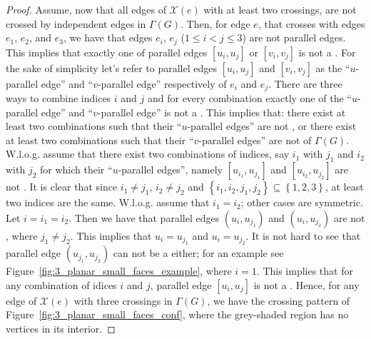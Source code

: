 \begin{proof}
Assume, now that all edges of $\mathcal{X}(e)$ with at least two crossings, are not crossed by independent edges in $\Gamma(G)$. Then, for edge $e$, that crosses with edges $e_1$, $e_2$, and $e_3$, we have that edges $e_i$, $e_j$ ($1\leq i<j\leq 3$) are not parallel edges. This implies that exactly one of parallel edges $[u_i,u_j]$ or $[v_i,v_j]$ is not a \pe. For the sake of simplicity let's refer to parallel edges $[u_i,u_j]$ and $[v_i,v_j]$ as the ``$u$-parallel edge'' and ``$v$-parallel edge'' respectively of $e_i$ and $e_j$. 
There are three ways to combine indices $i$ and $j$ and for every combination exactly one of the ``$u$-parallel edge'' and ``$v$-parallel edge'' is not a \pe. This implies that: there exist at least two combinations such that their ``$u$-parallel edges'' are not \pes, or there exist at least two combinations such that their ``$v$-parallel edges'' are not \pes of $\Gamma(G)$. W.l.o.g. assume that there exist two combinations of indices, say $i_1$ with $j_1$ and $i_2$ with $j_2$ for which their ``$u$-parallel edges'', namely $[u_{i_1},u_{j_1}]$ and $[u_{i_2},u_{j_2}]$  are not \pes. It is clear that since $i_1\neq j_1$, $i_2\neq j_2$ and $\left\{i_1,i_2,j_1,j_2\right\}\subseteq\left\{1,2,3\right\}$, at least two indices are the same. W.l.o.g. assume that $i_1=i_2$; other cases are symmetric. Let $i=i_1=i_2$. Then we have that parallel edges  $(u_i,u_{j_1})$ and $(u_i,u_{j_2})$ are not \pes, where $j_1\neq j_2$. This implies that $u_i=u_{j_1}$ and $u_i=u_{j_2}$. It is not hard to see that parallel edge $(u_{j_1},u_{j_2})$ can not be a \pe either; for an example see Figure~\ref{fig:3_planar_small_faces_example}, where $i=1$. This implies that for any combination of idices $i$ and $j$, parallel edge $[u_i,u_j]$ is not a \pe. Hence, for any edge of $\mathcal{X}(e)$ with three crossings in $\Gamma(G)$, we have the crossing pattern of Figure~\ref{fig:3_planar_small_faces_conf}, where the grey-shaded region has no vertices in its interior.



\end{proof}

